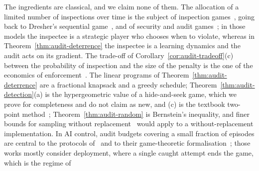 \begin{remark}\label{rem:audit-related}
The ingredients are classical, and we claim none of them. The allocation of a
limited number of inspections over time is the subject of inspection
games~\cite{avenhaus2002inspection}, going back to Dresher's sequential
game~\cite{dresher1962sampling}, and of security and audit
games~\cite{tambe2011security,blocki2013audit}; in those models the inspectee is
a strategic player who chooses when to violate, whereas in
Theorem~\ref{thm:audit-deterrence} the inspectee is a learning dynamics and the
audit acts on its gradient. The trade-off of
Corollary~\ref{cor:audit-tradeoff}(c) between the probability of inspection and
the size of the penalty is the one of the economics of
enforcement~\cite{becker1968crime}. The linear programs of
Theorem~\ref{thm:audit-deterrence} are a fractional knapsack and a greedy
schedule; Theorem~\ref{thm:audit-detection}(a) is the hypergeometric value of a
hide-and-seek game, which we prove for completeness and do not claim as new,
and (c) is the textbook two-point method~\cite{lecam1973convergence,yu1997assouad};
Theorem~\ref{thm:audit-random} is Bernstein's inequality, and finer bounds for
sampling without replacement~\cite{hoeffding1963probability,serfling1974probability}
would apply to a without-replacement implementation. In AI control, audit
budgets covering a small fraction of episodes are central to the protocols
of~\cite{greenblatt2023control} and to their game-theoretic
formalisation~\cite{griffin2024games}; those works mostly consider deployment, where a
single caught attempt ends the game, which is the regime of

\end{remark}
